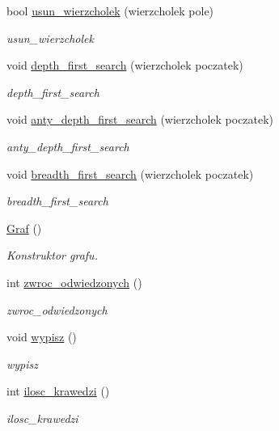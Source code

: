 \begin{DoxyCompactItemize}
bool \hyperlink{class_graf_afe4ec99c6fcbe71b27025573427773c6}{usun\+\_\+wierzcholek} (wierzcholek pole)
\begin{DoxyCompactList}\small\item\em usun\+\_\+wierzcholek \end{DoxyCompactList}\item 
void \hyperlink{class_graf_a7c1d929e180d33087ca774ce1c2c2ff5}{depth\+\_\+first\+\_\+search} (wierzcholek poczatek)
\begin{DoxyCompactList}\small\item\em depth\+\_\+first\+\_\+search \end{DoxyCompactList}\item 
void \hyperlink{class_graf_ab34f72112bc953a148e51eb479222797}{anty\+\_\+depth\+\_\+first\+\_\+search} (wierzcholek poczatek)
\begin{DoxyCompactList}\small\item\em anty\+\_\+depth\+\_\+first\+\_\+search \end{DoxyCompactList}\item 
void \hyperlink{class_graf_aee3970f1a56eb53223f30d0ae48ef612}{breadth\+\_\+first\+\_\+search} (wierzcholek poczatek)
\begin{DoxyCompactList}\small\item\em breadth\+\_\+first\+\_\+search \end{DoxyCompactList}\item 
\hyperlink{class_graf_abc168cfda60ca1af9ea6b519b368cdcb}{Graf} ()
\begin{DoxyCompactList}\small\item\em Konstruktor grafu. \end{DoxyCompactList}\item 
int \hyperlink{class_graf_a06d0a3918059f517745474009d914300}{zwroc\+\_\+odwiedzonych} ()
\begin{DoxyCompactList}\small\item\em zwroc\+\_\+odwiedzonych \end{DoxyCompactList}\item 
void \hyperlink{class_graf_a4b4c691cb70c87ddd066840e397b7212}{wypisz} ()
\begin{DoxyCompactList}\small\item\em wypisz \end{DoxyCompactList}\item 
int \hyperlink{class_graf_ade1cb15f2ea58de66f3d93d1677d8103}{ilosc\+\_\+krawedzi} ()
\begin{DoxyCompactList}\small\item\em ilosc\+\_\+krawedzi \end{DoxyCompactList}\end{DoxyCompactItemize}



